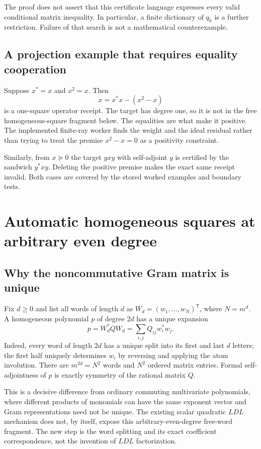 The proof does not assert that this certificate language expresses every valid
conditional matrix inequality. In particular, a finite dictionary of $q_k$ is a
further restriction. Failure of that search is not a mathematical counterexample.

\subsection{A projection example that requires equality cooperation}

Suppose $x^*=x$ and $x^2=x$. Then
\[
 x=x^*x-(x^2-x)
\]
is a one-square operator receipt. The target has degree one, so it is not in the
free homogeneous-square fragment below. The equalities are what make it
positive. The implemented finite-ray worker finds the weight and the ideal
residual rather than trying to treat the premise $x^2-x=0$ as a positivity
constraint.

Similarly, from $x\succeq0$ the target $yxy$ with self-adjoint $y$ is certified
by the sandwich $y^*xy$. Deleting the positive premise makes the exact same
receipt invalid. Both cases are covered by the stored worked examples and
boundary tests.

\section{Automatic homogeneous squares at arbitrary even degree}
\label{sec:gram}

\subsection{Why the noncommutative Gram matrix is unique}

Fix $d\ge0$ and list all words of length $d$ as
$W_d=(w_1,\ldots,w_N)^{\mathsf T}$, where $N=m^d$. A homogeneous polynomial
$p$ of degree $2d$ has a unique expansion
\begin{equation}\label{eq:gram}
 p=W_d^* Q W_d=\sum_{i,j}Q_{ij}w_i^*w_j.
\end{equation}
Indeed, every word of length $2d$ has a unique split into its first and last
$d$ letters; the first half uniquely determines $w_i$ by reversing and applying
the atom involution. There are $m^{2d}=N^2$ words and $N^2$ ordered matrix entries.
Formal self-adjointness of $p$ is exactly symmetry of the rational matrix $Q$.

This is a decisive difference from ordinary commuting multivariate polynomials,
where different products of monomials can have the same exponent vector and
Gram representations need not be unique. The existing scalar quadratic $LDL$
mechanism does not, by itself, expose this arbitrary-even-degree free-word
fragment. The new step is the word splitting and its exact coefficient
correspondence, not the invention of $LDL$ factorization.

